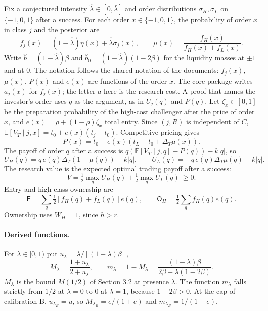 \documentclass[12pt]{article}
\theoremstyle{definition}
\theoremstyle{remark}
\newcommand{\E}{\mathbb E}
\newcommand{\Ent}{\mathsf E}
\newcommand{\Own}{\mathsf O}
\newcommand{\DT}{\Delta_T}
\newcommand{\lh}{\hat\lambda}
\newcommand{\lb}{\bar\lambda}
\begin{document}
Fix a conjectured intensity $\lh\in[0,\lb]$ and order distributions $\sigma_H,\sigma_L$ on $\{-1,0,1\}$ after a
success. For each order $x\in\{-1,0,1\}$, the probability of order $x$ in class $j$ and the posterior are
\begin{equation}\label{eq:masses}
f_j(x)=(1-\lh)\eta(x)+\lh\sigma_j(x),\qquad \mu(x)=\frac{f_H(x)}{f_H(x)+f_L(x)} .
\end{equation}
Write $\hat b=(1-\lh)\beta$ and $\hat b_0=(1-\lh)(1-2\beta)$ for the liquidity masses at $\pm1$ and at $0$. The
notation follows the shared notation of the documents: $f_j(x)$, $\mu(x)$, $P(x)$ and $e(x)$ are functions of the
order $x$. The core package writes $a_j(x)$ for $f_j(x)$; the letter $a$ here is the research cost. A proof that
names the investor's order uses $q$ as the argument, as in $U_j(q)$ and $P(q)$.
Let $\zeta_x\in[0,1]$ be the preparation probability of the high-cost challenger after the price of order $x$, and
$e(x)=\rho+(1-\rho)\zeta_x$ total entry. Since $(j,R)$ is independent of $C$,
$\E[V_T\mid j,x]=t_0+e(x)(t_j-t_0)$. Competitive pricing gives
\begin{equation}\label{eq:price}
P(x)=t_0+e(x)\left(t_L-t_0+\DT\mu(x)\right).
\end{equation}
The payoff of order $q$ after a success is $q(\E[V_T\mid j,q]-P(q))-k|q|$, so
\begin{equation}\label{eq:payoffs}
U_H(q)=q\,e(q)\DT(1-\mu(q))-k|q|,\qquad U_L(q)=-q\,e(q)\DT\mu(q)-k|q| .
\end{equation}
The research value is the expected optimal trading payoff after a success:
\begin{equation}\label{eq:V}
V=\tfrac12\max_q U_H(q)+\tfrac12\max_q U_L(q)\ \ge 0 .
\end{equation}
Entry and high-class ownership are
\begin{equation}\label{eq:entry}
\Ent=\sum_q \tfrac12\left[f_H(q)+f_L(q)\right]e(q),\qquad \Own_H=\tfrac12\sum_q f_H(q)e(q) .
\end{equation}
Ownership uses $W_H=1$, since $h>r$.

\paragraph{Derived functions.} For $\lambda\in[0,1)$ put $u_\lambda=\lambda/[(1-\lambda)\beta]$,
\[
M_\lambda=\frac{1+u_\lambda}{2+u_\lambda},\qquad
m_\lambda=1-M_\lambda=\frac{(1-\lambda)\beta}{2\beta+\lambda(1-2\beta)} .
\]
$M_\lambda$ is the bound $M(1/2)$ of Section 3.2 at presence $\lambda$. The function $m_\lambda$ falls strictly from
$1/2$ at $\lambda=0$ to $0$ at $\lambda=1$, because $1-2\beta>0$. At the cap of calibration B,
$u_{\lambda_B}=u$, so $M_{\lambda_B}=e/(1+e)$ and $m_{\lambda_B}=1/(1+e)$.
\end{document}
